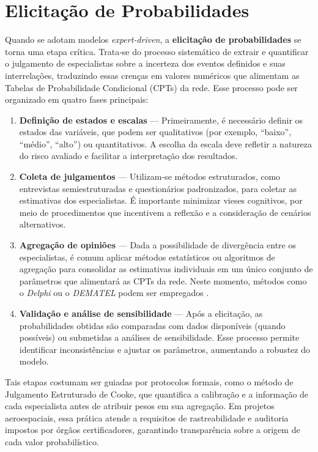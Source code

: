 \section{Elicitação de Probabilidades}
\label{sec:elicitation}
Quando se adotam modelos \emph{expert‑driven}, a \textbf{elicitação de probabilidades} se torna uma etapa crítica. Trata‑se do processo sistemático de extrair e quantificar o julgamento de especialistas sobre a incerteza dos eventos definidos e suas interrelações, traduzindo essas crenças em valores numéricos que alimentam as Tabelas de Probabilidade Condicional (CPTs) da rede. Esse processo pode ser organizado em quatro fases principais:

\begin{enumerate}
  \item \textbf{Definição de estados e escalas} — Primeiramente, é necessário definir os estados das variáveis, que podem ser qualitativos (por exemplo, “baixo”, “médio”, “alto”) ou quantitativos. A escolha da escala deve refletir a natureza do risco avaliado e facilitar a interpretação dos resultados.

  \item \textbf{Coleta de julgamentos} — Utilizam-se métodos estruturados, como entrevistas semiestruturadas e questionários padronizados, para coletar as estimativas dos especialistas. É importante minimizar vieses cognitivos, por meio de procedimentos que incentivem a reflexão e a consideração de cenários alternativos. 

  \item \textbf{Agregação de opiniões} — Dada a possibilidade de divergência entre os especialistas, é comum aplicar métodos estatísticos ou algoritmos de agregação para consolidar as estimativas individuais em um único conjunto de parâmetros que alimentará as CPTs da rede. Neste momento, métodos como o \emph{Delphi} ou o \emph{DEMATEL} podem ser empregados \cite{delphi,dematel}.

  \item \textbf{Validação e análise de sensibilidade} — Após a elicitação, as probabilidades obtidas são comparadas com dados disponíveis (quando possíveis) ou submetidas a análises de sensibilidade. Esse processo permite identificar inconsistências e ajustar os parâmetros, aumentando a robustez do modelo.
\end{enumerate}

Tais etapas costumam ser guiadas por protocolos formais, como o método de Julgamento Estruturado de Cooke, que quantifica a calibração e a informação de cada especialista antes de atribuir pesos em sua agregação. Em projetos aeroespaciais, essa prática atende a requisitos de rastreabilidade e auditoria impostos por órgãos certificadores, garantindo transparência sobre a origem de cada valor probabilístico.

